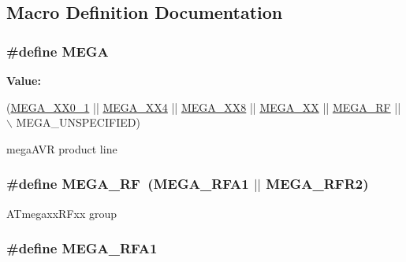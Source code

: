 \subsection{Macro Definition Documentation}
\hypertarget{group__mega__part__macros__group_ga78a6115b485de47c7cc56b224c558ea2}{
\subsubsection[{M\-E\-G\-A}]{\setlength{\rightskip}{0pt plus 5cm}\#define M\-E\-G\-A}}\label{group__mega__part__macros__group_ga78a6115b485de47c7cc56b224c558ea2}
{\bfseries Value\-:}
\begin{DoxyCode}
(\hyperlink{group__mega__part__macros__group_ga59ba73abcf65d3d398e7d37d78c271fe}{MEGA\_XX0\_1} || \hyperlink{group__mega__part__macros__group_gadcf5297df4d3d2f2bb5ccd7d6e3578b6}{MEGA\_XX4} || \hyperlink{group__mega__part__macros__group_ga47583caa82990781cd23a8495710ef31}{MEGA\_XX8} || \hyperlink{group__mega__part__macros__group_gabdf992a84b61d19055315a473c2e0f20}{MEGA\_XX}
       || \hyperlink{group__mega__part__macros__group_ga1d762b037d9532cdfbc28404113aa480}{MEGA\_RF} || \(\backslash\)
        MEGA\_UNSPECIFIED)
\end{DoxyCode}
mega\-A\-V\-R product line \hypertarget{group__mega__part__macros__group_ga1d762b037d9532cdfbc28404113aa480}{
\subsubsection[{M\-E\-G\-A\-\_\-\-R\-F}]{\setlength{\rightskip}{0pt plus 5cm}\#define M\-E\-G\-A\-\_\-\-R\-F~({\bf M\-E\-G\-A\-\_\-\-R\-F\-A1} $|$$|$ {\bf M\-E\-G\-A\-\_\-\-R\-F\-R2})}}\label{group__mega__part__macros__group_ga1d762b037d9532cdfbc28404113aa480}
A\-Tmegaxx\-R\-Fxx group \hypertarget{group__mega__part__macros__group_gaa301ab9851fc885a2d07f5df47d0a893}{
\subsubsection[{M\-E\-G\-A\-\_\-\-R\-F\-A1}]{\setlength{\rightskip}{0pt plus 5cm}\#define M\-E\-G\-A\-\_\-\-R\-F\-A1}}\label{group__mega__part__macros__group_gaa301ab9851fc885a2d07f5df47d0a893}
